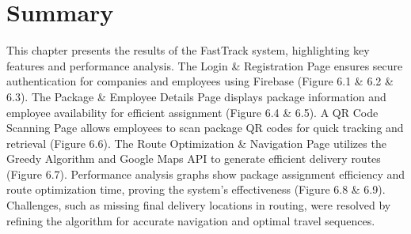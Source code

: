 \section{Summary}
This chapter presents the results of the FastTrack system, highlighting key features and performance
analysis. The Login \& Registration Page ensures secure authentication for companies and employees
using Firebase (Figure 6.1 \& 6.2 \& 6.3). The Package \& Employee Details Page displays package
information and employee availability for efficient assignment (Figure 6.4 \& 6.5). A QR Code
Scanning Page allows employees to scan package QR codes for quick tracking and retrieval (Figure
6.6). The Route Optimization \& Navigation Page utilizes the Greedy Algorithm and Google Maps
API to generate efficient delivery routes (Figure 6.7). Performance analysis graphs show package
assignment efficiency and route optimization time, proving the system’s effectiveness (Figure 6.8 \&  6.9). Challenges, such as missing final delivery locations in routing, were resolved by refining the algorithm for accurate navigation and optimal travel sequences.